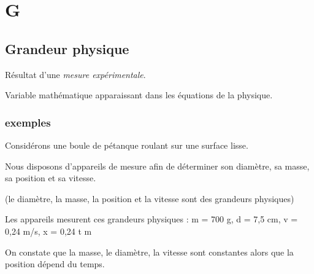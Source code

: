 \chapter{G}
\section{Grandeur physique}

Résultat d'une {\it mesure expérimentale}.

Variable mathématique apparaissant dans les équations de la physique.

\subsection{exemples}
Considérons une boule de pétanque roulant sur une surface lisse.

Nous disposons d'appareils de mesure afin de déterminer son diamètre, sa masse, sa position et sa vitesse.

(le diamètre, la masse, la position et la vitesse sont des grandeurs physiques)

Les appareils mesurent ces grandeurs physiques : m = 700 g, d = 7,5 cm, v = 0,24 m/s, x = 0,24 t m

On constate que la masse, le diamètre, la vitesse sont constantes alors que la position dépend du temps.


